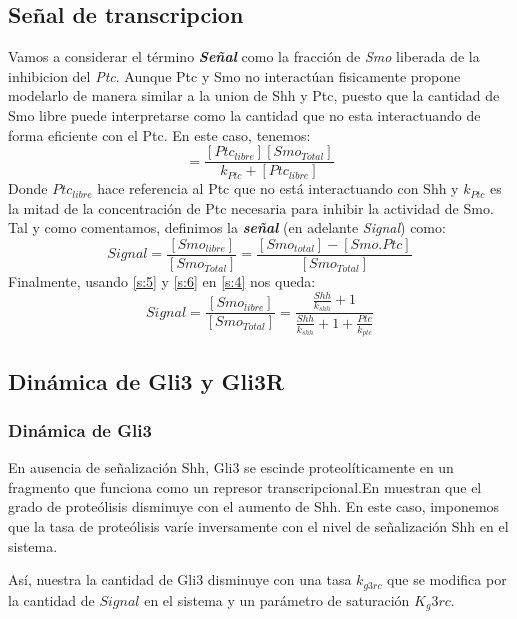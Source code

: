  \subsection{Señal de transcripcion}
 Vamos a considerar el término \textbf{\textit{Señal}} como la fracción de \textit{Smo} liberada de la inhibicion del \textit{Ptc}. Aunque Ptc y Smo no interactúan fisicamente \cite{schaffer} propone modelarlo de manera similar a la union de Shh y Ptc, puesto que la cantidad de Smo libre puede interpretarse como la cantidad que no esta interactuando de forma eficiente con el Ptc.
 En este caso, tenemos:
 \begin{equation}
 [Shh.Ptc]=\frac{[Ptc_{libre}][Smo_{Total}]}{k_{Ptc}+[Ptc_{libre}]}
 \label{s:5}
 \end{equation}
 Donde $Ptc_{libre}$ hace referencia al Ptc que no está interactuando con Shh y $k_{Ptc}$ es la mitad de la concentración de Ptc necesaria para inhibir la actividad de Smo.
 Tal y como comentamos, definimos la \textbf{\textit{señal}} (en adelante \textit{Signal}) como:
 \begin{equation}
 Signal=\frac{[Smo_{libre}]}{[Smo_{Total}]}=\frac{[Smo_{total}]-[Smo.Ptc]}{[Smo_{Total}]}
 \label{s:4}
 \end{equation}
 Finalmente, usando \ref{s:5} y \ref{s:6} en \ref{s:4} nos queda:
 \begin{equation}
 Signal=\frac{[Smo_{libre}]}{[Smo_{Total}]}=\frac{\frac{Shh}{k_{shh}} + 1}{\frac{Shh}{k_{shh}} + 1 + \frac{Ptc}{k_{ptc}}}
 \label{s:7}
 \end{equation}
 
 \subsection{Dinámica de Gli3 y Gli3R}
 \subsubsection{Dinámica de Gli3}
 En ausencia de señalización Shh, Gli3 se escinde proteolíticamente en un fragmento que funciona como un
 represor transcripcional.En \cite{wang2000hedgehog} muestran que el grado de proteólisis disminuye con el aumento de Shh. En este caso, imponemos que la tasa de proteólisis varíe inversamente con el nivel de señalización Shh en el sistema.
 
 Así, nuestra la cantidad de Gli3 disminuye con una tasa $k_{g3rc}$ que se modifica por la cantidad de $Signal$ en el sistema y un parámetro de saturación $K_g3rc$.
 

